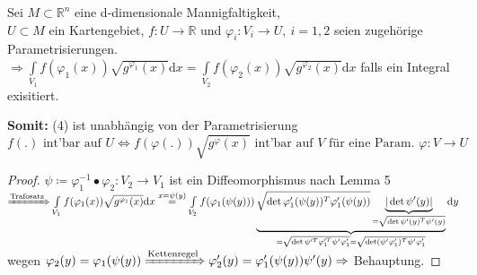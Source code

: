 \begin{satz}
    Sei $M \subset \mathbb{R}^n $ eine d-dimensionale Mannigfaltigkeit,\\
    $U \subset M $ ein Kartengebiet, $f:U \rightarrow \mathbb{R} $ und
    $\varphi_i: V_i \rightarrow U,\ i=1,2 $ seien zugehörige Parametrisierungen. \\
    $\Longrightarrow \int\limits_{V_1} f(\varphi_1(x)) \sqrt{g^{\varphi_1} (x)} \mathrm{d}x
    = \int\limits_{V_2} f(\varphi_2(x)) \sqrt{g^{\varphi_2} (x)} \mathrm{d}x
    $ falls ein Integral exisitiert.
\end{satz}

\textbf{Somit:} (4) ist unabhängig von der Parametrisierung
\begin{equation}
    f(.) \text{ int'bar auf } U
    \Longleftrightarrow f(\varphi(.)) \sqrt{g^\varphi (x)} 
    \text{ int'bar auf } V
    \text{ für eine Param. }
    \varphi: V \rightarrow U
\end{equation}

\begin{proof}
    $\psi \coloneqq \varphi_1^{-1} \bullet \varphi_2: V_2 \rightarrow V_1 $
    ist ein Diffeomorphismus nach Lemma 5 \\
    $\xRightarrow{\text{Trafosatz}} 
    \int\limits_{V_1} f(\varphi_1(x)) \sqrt{g^{\varphi_1} (x)} \mathrm{d}x
    \stackrel{x=\psi(y)}{=}
    \int\limits_{V_2} f(\varphi_1(\psi(y)))
    \underbrace{
        \sqrt{\det \varphi_1'(\psi(y))^T \varphi_1'(\psi(y))}
        \underbrace{
            |\det \psi'(y)|
            }_{
            = \sqrt{\det \psi'(y)^T \psi'(y)}}
        }_{
        = \sqrt{\det \psi'^T \varphi_1'^T \psi' \varphi_1'}
        = \sqrt{\det (\psi' \varphi_1')^T \psi' \varphi_1'}
        }
    \mathrm{d}y
    $ wegen $
    \varphi_2 (y) = \varphi_1 (\psi(y))
    \xRightarrow{\text{Kettenregel}}
    \varphi_2' (y) = \varphi_1' (\psi(y)) \psi'(y)
    \Rightarrow $ Behauptung.
\end{proof}